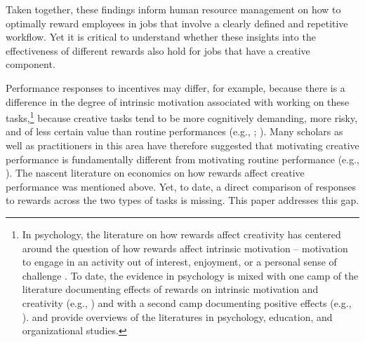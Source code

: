Taken together, these findings inform human resource management on how 
to optimally reward employees in jobs that involve a clearly 
defined and repetitive workflow. Yet it is critical to understand 
whether these insights into the effectiveness of different rewards 
also hold for jobs that have a creative component.

Performance responses to incentives may differ, for example, because there is a difference 
in the degree of intrinsic motivation associated with working on these tasks,\footnote{
In psychology, the literature on how rewards affect creativity has centered around the 
question of how rewards affect intrinsic motivation -- motivation to engage in an 
activity out of interest, enjoyment, or a personal sense of challenge \citep{Amabile13}.
To date, the evidence in psychology is mixed with one camp of the literature documenting effects of rewards on intrinsic motivation and creativity (e.g., \citealp{Amabile1996, Joussemet1999, Deci99PB}) and with a second camp documenting positive effects (e.g., \citealp{Eisenberger2001, Eisenberger2003}).   \citet{Shalley2004}
and \citet{byron12} provide overviews of the literatures in psychology, 
education, and organizational studies. } because 
creative tasks tend to be more cognitively demanding, 
more risky, and of less
certain value than routine performances (e.g., \citealp{Amabile1996}; \citealp{eysenck95}). 
Many scholars as well as practitioners in this area have therefore suggested that motivating creative
performance is fundamentally different from motivating routine performance (e.g., \citealp{Amabile1996}). The nascent literature on economics on how rewards affect creative performance was mentioned above. Yet, to date, a direct comparison of responses to rewards across the two types of tasks is missing.  
 This paper addresses this gap.  






